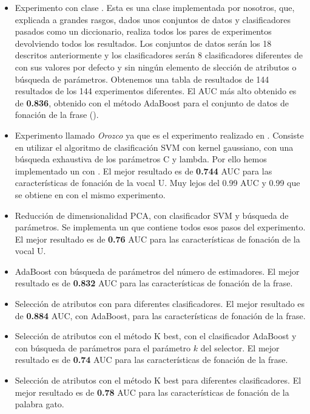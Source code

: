 \begin{itemize}
\item  Experimento con clase . Esta es una clase implementada por nosotros, que, explicada a grandes rasgos, dados unos conjuntos de datos y clasificadores pasados como un diccionario, realiza todos los pares de experimentos devolviendo todos los resultados. Los conjuntos de datos serán los 18 descritos anteriormente y los clasificadores serán 8 clasificadores diferentes de  con sus valores por defecto y sin ningún elemento de slección de atributos o búsqueda de parámetros. Obtenemos una tabla de resultados de 144 resultados de los 144 experimentos diferentes. El AUC más alto obtenido es de \textbf{0.836}, obtenido con el método AdaBoost para el conjunto de datos de fonación de la frase ().
\item Experimento llamado \textit{Orozco} ya que es el experimento realizado en \cite{Orz2016}. Consiste en utilizar el algoritmo de clasificación SVM con kernel gaussiano, con una búsqueda exhaustiva de los parámetros C y lambda. Por ello hemos implementado un  con . El mejor resultado es de \textbf{0.744} AUC para las características de fonación de la vocal U. Muy lejos del 0.99 AUC y 0.99  que se obtiene en \cite{Orz2016} con el mismo experimento.
\item Reducción de dimensionalidad PCA, con clasificador SVM y búsqueda de parámetros. Se implementa un  que contiene todos esos pasos del experimento. El mejor resultado es de \textbf{0.76} AUC para las características de fonación de la vocal U.
\item AdaBoost con búsqueda de parámetros del número de estimadores. El mejor resultado es de \textbf{0.832} AUC para las características de fonación de la frase.
\item Selección de atributos con  para diferentes clasificadores. El mejor resultado es de \textbf{0.884} AUC, con AdaBoost, para las características de fonación de la frase.
\item Selección de atributos con el método K best, con el clasificador AdaBoost y con búsqueda de parámetros para el parámetro $k$ del selector. El mejor resultado es de \textbf{0.74} AUC para las características de fonación de la frase.
\item Selección de atributos con el método K best para diferentes clasificadores. El mejor resultado es de \textbf{0.78} AUC para las características de fonación de la palabra gato.
\end{itemize}



